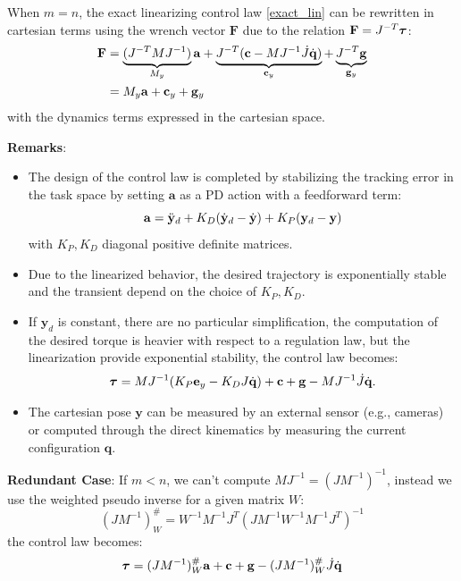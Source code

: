 \documentclass[10pt, a4paper]{report}
\newcommand{\y}{{\mathbf y}}
\newcommand{\q}{{\mathbf q}}
\begin{document}
When $m=n$, the exact linearizing control law \eqref{exact_lin} can be rewritten in cartesian terms using the wrench vector $\mathbf F$ due to the relation $\mathbf F=J^{-T}{\boldsymbol{\tau}}$:\begin{align}
    \mathbf F&=\underbrace{(J^{-T}MJ^{-1})}_{M_y}\mathbf a+\underbrace{J^{-T}(\mathbf c-MJ^{-1}\dot J{\dot{\mathbf q}} )}_{\mathbf c_y}+\underbrace{J^{-T}\mathbf g}_{\mathbf g_y}\\
    &=M_y\mathbf a + \mathbf c_y+\mathbf g_y
\end{align}
with the dynamics terms expressed in the cartesian space.\bigskip

\noindent\textbf{Remarks}:\begin{itemize}
    \item The design of the control law is completed by stabilizing the tracking error in the task space by setting $\mathbf a$ as a PD action with a feedforward term:\begin{equation}
        \mathbf a=\ddy_d+K_D(\dy_d-\dy)+K_P(\y_d-\y)
    \end{equation}
    with $K_P,K_D$ diagonal positive definite matrices.
    \item Due to the linearized behavior, the desired trajectory is exponentially stable and the transient depend on the choice of $K_P,K_D$. 
    \item If $\y_d$ is constant, there are no particular simplification, the computation of the desired torque is heavier with respect to a regulation law, but the linearization provide exponential stability, the control law becomes:\begin{equation}
        {\boldsymbol{\tau}}=MJ^{-1}(K_P\mathbf e_y-K_DJ{\dot{\mathbf q}})+\mathbf c+\mathbf g-MJ^{-1}\dot J{\dot{\mathbf q}}.
    \end{equation}
    \item The cartesian pose $\y$ can be measured by an external sensor (e.g., cameras) or computed through the direct kinematics by measuring the current configuration $\q$.
\end{itemize}
\textbf{Redundant Case}: If $m<n$, we can't compute $MJ^{-1}=(JM^{-1})^{-1}$, instead we use the weighted pseudo inverse for a given matrix $W$:\begin{equation}
    (JM^{-1})^\#_W=W^{-1}M^{-1}J^T(JM^{-1}W^{-1}M^{-1}J^T)^{-1}
\end{equation}
the control law becomes:\begin{equation}
    {\boldsymbol{\tau}}=(JM^{-1})^\#_W\mathbf a+\mathbf c+\mathbf g-(JM^{-1})^\#_W\dot J{\dot{\mathbf q}} 
\end{equation}
\end{document}
